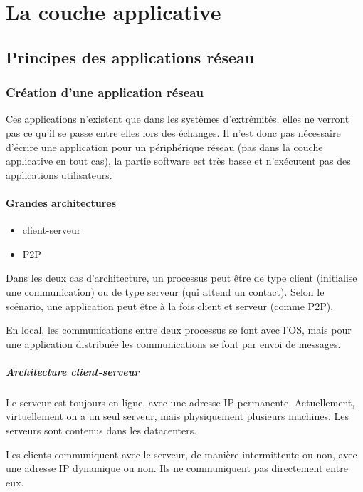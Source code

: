 \chapter{La couche applicative}

\section{Principes des applications réseau}

	\subsection{Création d'une application réseau}
	
	Ces applications n'existent que dans les systèmes d'extrémités, elles ne verront pas ce qu'il se passe entre elles lors des échanges. Il n'est donc pas nécessaire d'écrire une application pour un périphérique réseau (pas dans la couche applicative en tout cas), la partie software est très basse et n'exécutent pas des applications utilisateurs.
	
		\subsubsection{Grandes architectures}
	
	\begin{itemize}
		\item client-serveur
		\item P2P
	\end{itemize}
	
	Dans les deux cas d'architecture, un processus peut être de type client (initialise une communication) ou de type serveur (qui attend un contact). Selon le scénario, une application peut être à la fois client et serveur (comme P2P).
	
	En local, les communications entre deux processus se font avec l'OS, mais pour une application distribuée les communications se font par envoi de messages.
	
	\paragraph{Architecture client-serveur}
		
	Le serveur est toujours en ligne, avec une adresse IP permanente. Actuellement, virtuellement on a un seul serveur, mais physiquement plusieurs machines. Les serveurs sont contenus dans les datacenters.
		
	Les clients communiquent avec le serveur, de manière intermittente ou non, avec une adresse IP dynamique ou non. Ils ne communiquent pas directement entre eux.
		
